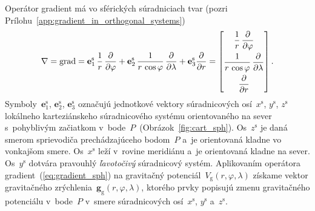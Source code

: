 \documentclass[a4paper,12pt]{book}
\newcommand{\grad}{\mathrm{grad}}
\newcommand{\gidx}{\mathrm g}
\let\vec\mathbf
\begin{document}
Operátor gradient má vo sférických súradniciach tvar (pozri 
Prílohu~\ref{app:gradient_in_orthogonal_systems})
%
\begin{equation}
\label{eq:gradient_sph}
\nabla = \grad = \vec e_1^\mathrm{s} \, \frac{1}{r} \, \frac{\partial}{\partial 
\varphi} + \vec e_2^\mathrm{s} \, \frac{1}{r \, \cos\varphi} \, 
\frac{\partial}{\partial \lambda} + \vec e_3^\mathrm{s} 
\frac{\partial}{\partial r}\\
%
=
%
\begin{bmatrix}
\dfrac{1}{r} \, \dfrac{\partial}{\partial \varphi} \\[2ex]
\dfrac{1}{r \, \cos\varphi} \, \dfrac{\partial}{\partial \lambda}\\[2ex]
\dfrac{\partial}{\partial r}
\end{bmatrix}
{.}
\end{equation}
%
Symboly~$\vec{e}_1^\mathrm{s}$, $\vec{e}_2^{\mathrm{s}}$, 
$\vec{e}_3^\mathrm{s}$ označujú jednotkové vektory súradnicových 
osí~$x^\mathrm{s}$, $y^\mathrm{s}$, $z^\mathrm{s}$ lokálneho karteziánskeho 
súradnicového systému orientovaného na sever s~pohyblivým začiatkom 
v~bode~$P$~(Obrázok~\ref{fig:cart_sph}).  Os~$z^\mathrm{s}$ je daná smerom 
sprievodiča prechádzajúceho bodom~$P$ a~je orientovaná kladne vo vonkajšom 
smere.  Os~$x^\mathrm{s}$ leží v~rovine meridiánu a~je orientovaná kladne na 
sever.  Os~$y^\mathrm{s}$ dotvára pravouhlý \emph{ľavotočivý} súradnicový 
systém.  Aplikovaním operátora gradient~(\ref{eq:gradient_sph}) na gravitačný 
potenciál~$V_\gidx(r, \varphi, \lambda)$ získame vektor gravitačného 
zrýchlenia~$\vec g_\gidx(r, \varphi, \lambda)$, ktorého prvky popisujú zmenu 
gravitačného potenciálu v~bode~$P$ v~smere súradnicových osí~$x^\mathrm{s}$, 
$y^\mathrm{s}$ a~$z^\mathrm{s}$.
\end{document}
